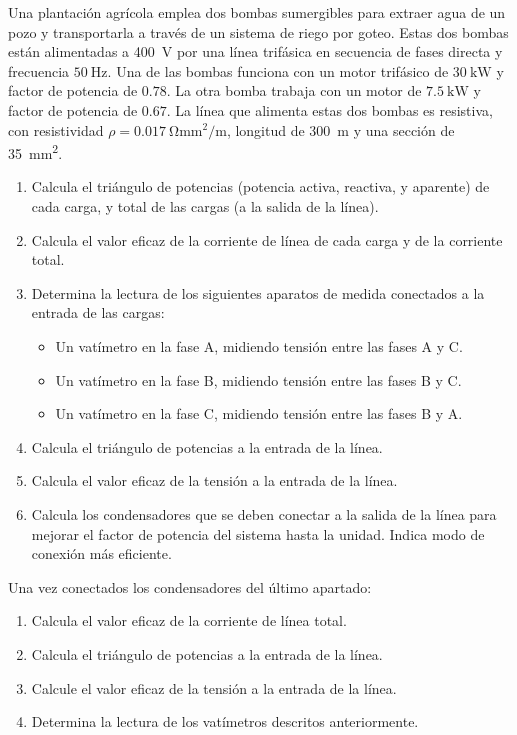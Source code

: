  Una plantación agrícola emplea dos bombas sumergibles para extraer
 agua de un pozo y transportarla a través de un sistema de riego por
 goteo. Estas dos bombas están alimentadas a \SI{400}{\volt} por una
 línea trifásica en secuencia de fases directa y frecuencia
 $\SI{50}{\hertz}$. Una de las bombas funciona con un motor trifásico
 de $\SI{30}{\kilo\watt}$ y factor de potencia de $0.78$. La otra bomba
 trabaja con un motor de $\SI{7.5}{\kilo\watt}$ y factor de potencia
 de $0.67$.  La línea que alimenta estas dos bombas es resistiva, con
 resistividad $\rho = \SI{0.017}{\ohm\milli\meter\squared\per\meter}$,
 longitud de \SI{300}{m} y una sección de
 \SI{35}{\milli\meter\squared}.
 
 \begin{enumerate}
 \item Calcula el triángulo de potencias (potencia activa, reactiva, y
   aparente) de cada carga, y total de las cargas (a la salida de la
   línea).
 \item Calcula el valor eficaz de la corriente de línea de
   cada carga y de la corriente total.
 \item Determina la lectura de los siguientes aparatos de medida
   conectados a la entrada de las cargas:
   \begin{itemize}
   \item Un vatímetro en la fase A, midiendo tensión entre las fases A
     y C.
   \item Un vatímetro en la fase B, midiendo tensión entre las fases B
     y C.
   \item Un vatímetro en la fase C, midiendo tensión entre las fases B
     y A.
   \end{itemize}
 \item Calcula el triángulo de potencias a la entrada de la línea.
 \item Calcula el valor eficaz de la tensión a la entrada de la línea.
 \item Calcula los condensadores que se deben conectar a la salida de
   la línea para mejorar el factor de potencia del sistema hasta la
   unidad. Indica modo de conexión más eficiente.
 \end{enumerate}

Una vez conectados los condensadores del último apartado:
\begin{enumerate}[resume]
\item Calcula el valor eficaz de la corriente de línea total.
\item Calcula el triángulo de potencias a la entrada de la línea.
\item Calcule el valor eficaz de la tensión a la entrada de la línea.
\item Determina la lectura de los vatímetros descritos anteriormente.
\end{enumerate}

